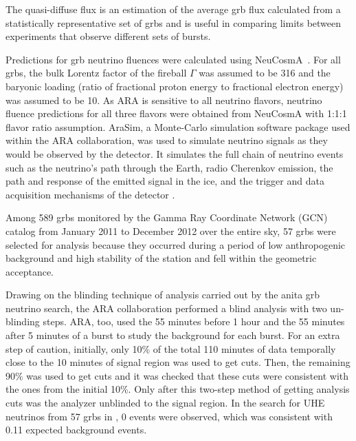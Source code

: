 The quasi-diffuse flux is an estimation of the average \gls{grb} flux calculated from a statistically representative set of \gls{grb}s and is useful in comparing limits between experiments that observe different sets of bursts.

Predictions for \gls{grb} neutrino fluences were calculated using NeuCosmA~\cite{neucosma1,neucosma2}. For all \gls{grbs}, the bulk Lorentz factor of the fireball $\Gamma$ was assumed to be 316 and the baryonic loading (ratio of fractional proton energy to fractional electron energy) was assumed to be 10. As ARA is sensitive to all neutrino flavors, neutrino fluence predictions for all three flavors were obtained from NeuCosmA with 1:1:1 flavor ratio assumption. AraSim, a Monte-Carlo simulation software package used within the ARA collaboration, was used to simulate neutrino signals as they would be observed by the detector. It simulates the full chain of neutrino events such as the neutrino's path through the Earth, radio Cherenkov emission, the path and response of the emitted signal in the ice, and the trigger and data acquisition mechanisms of the detector \cite{araproto}. 

Among 589 \gls{grbs} monitored by the Gamma Ray Coordinate Network (GCN) catalog from January 2011 to December 2012 over the entire sky, 57 \gls{grbs} were selected for analysis because they occurred during a period of low anthropogenic background and high stability of the station and fell within the geometric acceptance.

Drawing on the blinding technique of analysis carried out by the \gls{anita} \gls{grb} neutrino search, the ARA collaboration performed a blind analysis with two un-blinding steps. ARA, too, used the 55 minutes before 1 hour and the 55 minutes after 5 minutes of a burst to study the background for each burst. For an extra step of caution, initially, only 10\% of the total 110 minutes of data temporally close to the 10 minutes of signal region was used to get cuts. Then, the remaining 90\% was used to get cuts and it was checked that these cuts were consistent with the ones from the initial 10\%. Only after this two-step method of getting analysis cuts was the analyzer unblinded to the signal region.
In the search for UHE neutrinos from 57 \gls{grbs} in \cite{araproto}, 0 events were observed, which was consistent with 0.11 expected background events.

